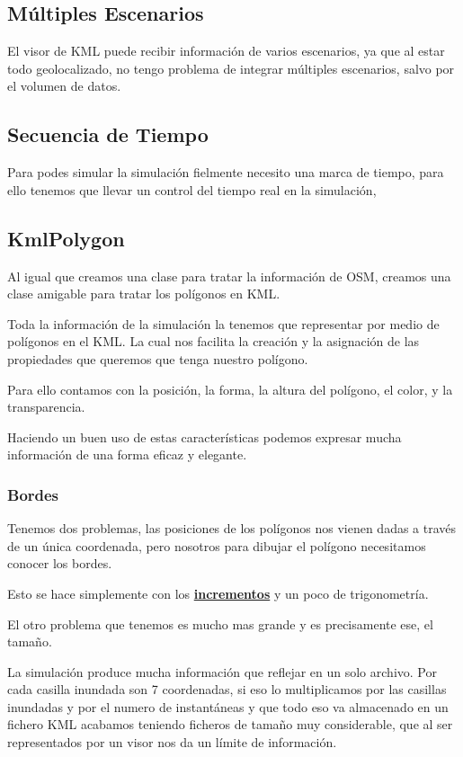 \subsection*{Múltiples Escenarios}
El visor de KML puede recibir información de varios escenarios, ya que al estar
todo geolocalizado, no tengo problema de integrar múltiples
escenarios, salvo por el volumen de datos.
\subsection*{Secuencia de Tiempo}
Para podes simular la simulación fielmente necesito una marca de tiempo, para
ello tenemos que llevar un control del tiempo real en la simulación, 
\subsection*{KmlPolygon}
Al igual que creamos una clase para tratar la información de OSM, creamos una
clase amigable para tratar los polígonos en KML.

Toda la información de la simulación la tenemos que representar por medio de
polígonos en el KML. La cual nos facilita la creación y la asignación de las
propiedades que queremos que tenga nuestro polígono.

Para ello contamos con la posición, la forma, la altura del polígono, el color,
y la transparencia.

Haciendo un buen uso de estas características podemos expresar mucha
información de una forma eficaz y elegante.
\subsubsection*{Bordes}
Tenemos dos problemas, las posiciones de los polígonos nos vienen dadas a
través de un única coordenada, pero nosotros para dibujar el polígono
necesitamos conocer los bordes.

Esto se hace simplemente con los \hyperref[incrementos]{\bf incrementos} y un
poco de trigonometría.

El otro problema que tenemos es mucho mas grande y es precisamente ese, el
tamaño.

La simulación produce mucha información que reflejar en un solo archivo. Por
cada casilla inundada son 7 coordenadas, si eso lo multiplicamos por las
casillas inundadas y por el numero de instantáneas y que todo eso va almacenado
en un fichero KML acabamos teniendo ficheros de tamaño muy considerable, que al
ser representados por un visor nos da un límite de información.

